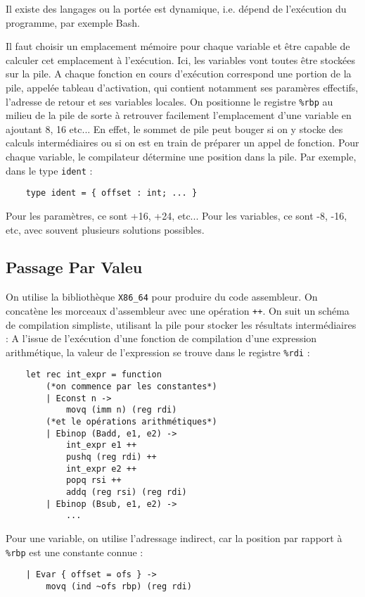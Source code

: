 \documentclass{cours}
\begin{document}
Il existe des langages ou la portée est dynamique, i.e. dépend de l'exécution du programme, par exemple Bash.

Il faut choisir un emplacement mémoire pour chaque variable et être capable de calculer cet emplacement à l'exécution. Ici, les variables vont toutes être stockées sur la pile. A chaque fonction en cours d'exécution correspond une portion de la pile, appelée tableau d'activation, qui contient notamment ses paramères effectifs, l'adresse de retour et ses variables locales. On positionne le registre \texttt{\%rbp} au milieu de la pile de sorte à retrouver facilement l'emplacement d'une variable en ajoutant 8, 16 etc... En effet, le sommet de pile peut bouger si on y stocke des calculs intermédiaires ou si on est en train de préparer un appel de fonction. Pour chaque variable, le compilateur détermine une position dans la pile. Par exemple, dans le type \texttt{ident} :
\begin{verbatim}
    type ident = { offset : int; ... }    
\end{verbatim}
Pour les paramètres, ce sont +16, +24, etc... Pour les variables, ce sont -8, -16, etc, avec souvent plusieurs solutions possibles.

\subsection{Passage Par Valeu}
On utilise la bibliothèque \texttt{X86\_64} pour produire du code assembleur. On concatène les morceaux d'assembleur avec une opération \texttt{++}. On suit un schéma de compilation simpliste, utilisant la pile pour stocker les résultats intermédiaires : A l'issue de l'exécution d'une fonction de compilation d'une expression arithmétique, la valeur de l'expression se trouve dans le registre \texttt{\%rdi} : 
\begin{verbatim}
    let rec int_expr = function
        (*on commence par les constantes*)
        | Econst n ->
            movq (imm n) (reg rdi)
        (*et le opérations arithmétiques*)
        | Ebinop (Badd, e1, e2) ->
            int_expr e1 ++
            pushq (reg rdi) ++
            int_expr e2 ++
            popq rsi ++
            addq (reg rsi) (reg rdi)
        | Ebinop (Bsub, e1, e2) ->
            ...
\end{verbatim}

Pour une variable, on utilise l'adressage indirect, car la position par rapport à \texttt{\%rbp} est une constante connue : 
\begin{verbatim}
    | Evar { offset = ofs } ->
        movq (ind ~ofs rbp) (reg rdi)
\end{verbatim}
\end{document}
